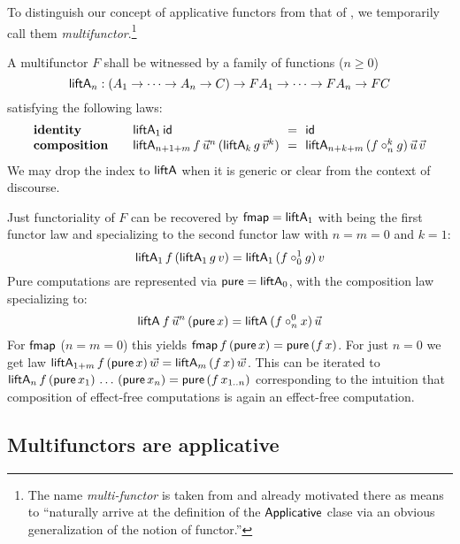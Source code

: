 {
To distinguish our concept of applicative functors from that of
\citeauthor{mcBridePaterson:jfp08}, we temporarily call them
\emph{multifunctor}.\footnote{
  The name \emph{multi-functor} is taken from
  \citet{capriottiKaposi:msfp14} and already motivated there as means
  to ``naturally arrive at the definition of the $\tApplicative$ clase
  via an obvious generalization of the notion of functor.''
}

A multifunctor $F$ shall be witnessed by a family of functions ($n \ge 0$)
\[
  \liftA[n] :
    (A_1 \to \dots \to A_n \to C) \to FA_1 \to \dots \to FA_n \to FC
\]
satisfying the following laws:
\[
  \begin{array}{l@{\qquad}l@{~~}l@{~~}l}
\law{identity} & \liftA[1]\,\tid & = & \tid \\
\law{composition}
  & \liftA[n+1+m]\,f\,\vec u^n\,(\liftA[k]\,g\,\vec v^k)
  & =
  & \liftA[n+k+m]\,(f \compose[k]n g)\,\vec u\, \vec v
  \end{array}
\]
%
We may %
drop the index to $\tliftA$ when it is
generic or clear from the context of discourse.

Just functoriality of $F$ can be recovered by $\tfmap = \liftA[1]$ with  being the first functor law and  specializing to the second functor law with $n=m=0$ and $k=1$:
\[
  \liftA[1]\,f\,(\liftA[1]\,g\,v) = \liftA[1]\,(f \compose[1]0 g)\,v
\]
Pure computations are represented via $\tpure = \liftA[0]$, with the composition law specializing to:
\[
  \liftA\,f\,\vec u^n\,(\pure x) %
  =
  \liftA\,(f \compose[0]n x)\,\vec u %
\]
For $\tfmap$ ($n = m = 0$) this yields $\fmap f (\pure x) = \pure (f\,x)$.
%
For just $n=0$ we get law $\liftA[1+m]\,f\,(\pure x)\,\vec w =
\liftA[m]\,(f\,x)\,\vec w$. This can be iterated to
$\liftA[n]\,f\,(\tpure\,x_1)\,\dots\,(\tpure\,x_n) =
\tpure\,(f\,x_{1..n})$ corresponding to the intuition that composition
of effect-free computations is again an effect-free computation.

\subsection{Multifunctors are applicative}

}
